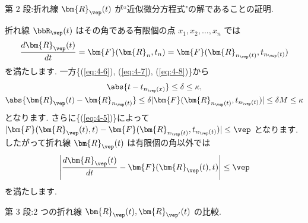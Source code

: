 \documentclass[openany, a4paper, oneside]{jsbook}
\begin{document}
第 2 段:折れ線 $\bm{R}_{\vep} (t)$ が``近似微分方程式"の解であることの証明.

折れ線 $\bbR_{\vep}(t)$ はその角である有限個の点 $x_1, x_2 ,\dots,x_n$ では
\begin{gather}
\frac{d \bm{R}_{\vep} ( t ) } {dt}
=
\bm{F} ( \bm{R}_n , t_n )
=
\bm{F} ( \bm{R}_{ n_{\vep} ( t ) } , t_{ n_{\vep} (t) } )
\end{gather}
を満たします.
一方\{(\ref{eq:4-6}), (\ref{eq:4-7}), (\ref{eq:4-8})\}から
\begin{gather}
\abs{t - t_{n_{\vep} (x)}}
\leq
\delta
\leq
\kappa
, \\
\abs{\bm{R}_{\vep} (t) - \bm{R}_{ n_{\vep} (t) }}
\leq
\delta | \bm{F} ( \bm{R}_{ n_{\vep} (t) } , t_{ n_{\vep} (t) } ) |
\leq
\delta M
\leq
\kappa
\end{gather}
となります.
さらに\{(\ref{eq:4-5})\}によって
$| \bm{F} ( \bm{R}_{\vep} (t) , t ) - \bm{F} ( \bm{R}_{ n_{\vep} ( t ) } , t_{ n_{\vep} (t) } ) | \leq \vep$
となります.
したがって折れ線 $\bm{R}_{\vep} (t)$ は有限個の角以外では
\begin{gather}
\left | \frac{ d \bm{R}_{\vep} ( t ) } {dt} - \bm{F} ( \bm{R}_{\vep} (t) , t )  \right|
\leq
\vep
\label{eq:4-9}
\end{gather}
を満たします.

第 3 段:2 つの折れ線 $\bm{R}_{\vep}(t),\bm{R}_{\vep '}(t)$ の比較.
\end{document}
